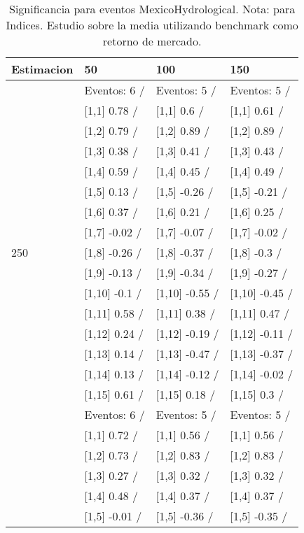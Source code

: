 \begin{table}

\caption{Significancia para eventos MexicoHydrological. Nota: para Indices. Estudio sobre la media utilizando benchmark como retorno de mercado.}
\centering
\begin{tabular}[t]{llll}
\toprule
Estimacion & 50 & 100 & 150\\
\midrule
 & Eventos:  6 / & Eventos:  5 / & Eventos:  5 /\\
 & {}[1,1] 0.78  / & {}[1,1] 0.6  / & {}[1,1] 0.61  /\\
 & {}[1,2] 0.79  / & {}[1,2] 0.89  / & {}[1,2] 0.89  /\\
 & {}[1,3] 0.38  / & {}[1,3] 0.41  / & {}[1,3] 0.43  /\\
 & {}[1,4] 0.59  / & {}[1,4] 0.45  / & {}[1,4] 0.49  /\\
\addlinespace
 & {}[1,5] 0.13  / & {}[1,5] -0.26  / & {}[1,5] -0.21  /\\
 & {}[1,6] 0.37  / & {}[1,6] 0.21  / & {}[1,6] 0.25  /\\
 & {}[1,7] -0.02  / & {}[1,7] -0.07  / & {}[1,7] -0.02  /\\
250 & {}[1,8] -0.26  / & {}[1,8] -0.37  / & {}[1,8] -0.3  /\\
 & {}[1,9] -0.13  / & {}[1,9] -0.34  / & {}[1,9] -0.27  /\\
\addlinespace
 & {}[1,10] -0.1  / & {}[1,10] -0.55  / & {}[1,10] -0.45  /\\
 & {}[1,11] 0.58  / & {}[1,11] 0.38  / & {}[1,11] 0.47  /\\
 & {}[1,12] 0.24  / & {}[1,12] -0.19  / & {}[1,12] -0.11  /\\
 & {}[1,13] 0.14  / & {}[1,13] -0.47  / & {}[1,13] -0.37  /\\
 & {}[1,14] 0.13  / & {}[1,14] -0.12  / & {}[1,14] -0.02  /\\
\addlinespace
 & {}[1,15] 0.61  / & {}[1,15] 0.18  / & {}[1,15] 0.3  /\\
 & Eventos:  6 / & Eventos:  5 / & Eventos:  5 /\\
 & {}[1,1] 0.72  / & {}[1,1] 0.56  / & {}[1,1] 0.56  /\\
 & {}[1,2] 0.73  / & {}[1,2] 0.83  / & {}[1,2] 0.83  /\\
 & {}[1,3] 0.27  / & {}[1,3] 0.32  / & {}[1,3] 0.32  /\\
\addlinespace
 & {}[1,4] 0.48  / & {}[1,4] 0.37  / & {}[1,4] 0.37  /\\
 & {}[1,5] -0.01  / & {}[1,5] -0.36  / & {}[1,5] -0.35  /\\

\end{tabular}
\end{table}

